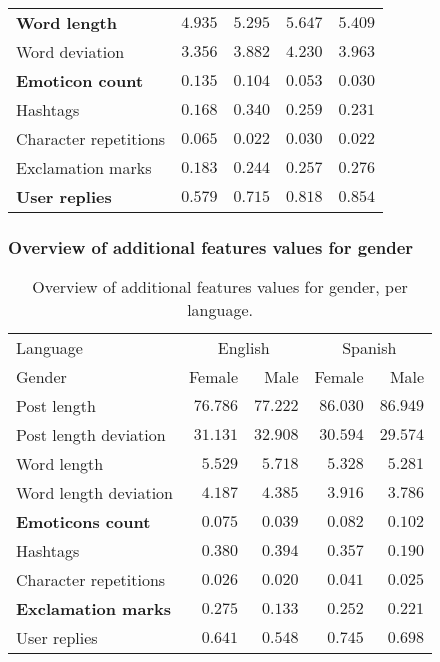 \documentclass[utf8]{beamer}
\begin{document}
\begin{frame}
{\begin{table}
\begin{center}
\begin{tabular}{l|rrrr}
					\textbf{Word length}  & $ 4.935 $ & $ 5.295 $ & $ 5.647 $ & $ 5.409 $ \\
					Word deviation  & $ 3.356 $ & $ 3.882 $ & $ 4.230 $ & $ 3.963 $ \\
					\textbf{Emoticon count}  & $ 0.135 $ & $ 0.104 $ & $ 0.053 $ & $ 0.030 $ \\
					Hashtags  & $ 0.168 $ & $ 0.340 $ & $ 0.259 $ & $ 0.231 $ \\
					Character repetitions  & $ 0.065 $ & $ 0.022 $ & $ 0.030 $ & $ 0.022 $ \\
					Exclamation marks & $ 0.183 $ & $ 0.244 $ & $ 0.257 $ & $ 0.276 $ \\
					\textbf{User replies} & $ 0.579 $ & $ 0.715 $ & $ 0.818 $ & $ 0.854 $ \\
					\bottomrule
				\end{tabular}
			\end{center}
		\end{table}
	}
\end{frame}

\begin{frame}
	\frametitle{Overview of additional features values for gender}
	\begin{table}
		\caption{Overview of additional features values for gender, per language.}
		\label{tab:additionalfeatures-gender}
		\begin{center}
			\begin{tabular}{l|rr|rr}
				\toprule
				Language & \multicolumn{2}{c|}{English} & \multicolumn{2}{c}{Spanish}  \\
				Gender & Female & Male & Female & Male \\
				\midrule
				Post length & $ 76.786 $ & $ 77.222 $ & $ 86.030 $ & $ 86.949 $ \\
				Post length deviation & $ 31.131 $ & $ 32.908 $ & $ 30.594 $ & $ 29.574 $ \\
				Word length & $ 5.529 $ & $ 5.718 $ & $ 5.328 $ & $ 5.281 $  \\
				Word length deviation & $ 4.187 $ & $ 4.385 $ & $ 3.916 $ & $ 3.786 $ \\
				\textbf{Emoticons count} & $ 0.075 $ & $ 0.039 $ & $ 0.082 $ & $ 0.102 $ \\
				Hashtags &  $ 0.380 $ & $ 0.394 $ & $ 0.357 $ & $ 0.190 $ \\
				Character repetitions & $ 0.026 $ & $ 0.020 $ & $ 0.041 $ & $ 0.025 $ \\
				\textbf{Exclamation marks} & $ 0.275 $ & $ 0.133 $ & $ 0.252 $ & $ 0.221 $\\
				User replies & $ 0.641 $ & $ 0.548 $ & $ 0.745 $ & $ 0.698 $ \\
				\bottomrule
			\end{tabular}
		\end{center}
	\end{table}
\end{frame}
\end{document}
